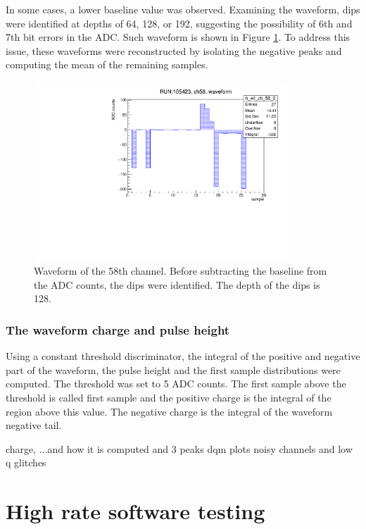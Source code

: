 In some cases, a lower baseline value was observed. Examining the waveform, dips were identified at depths of 64, 128, or 192, 
suggesting the possibility of 6th and 7th bit errors in the ADC. Such waveform is shown in Figure \ref{fig:dips}. 
To address this issue, these waveforms were reconstructed by isolating the negative peaks and computing the mean of the remaining samples.
\begin{figure}[!h]
  \centering
  \includegraphics[width=0.85\textwidth]{figures/pdf/wf_ch58_1.pdf}
  \caption{Waveform of the 58th channel. Before subtracting the baseline from the ADC counts, the dips were identified. The depth of the dips is 128.}
 \label{fig:dips}
\end{figure}
\subsubsection{The waveform charge and pulse height}
Using a constant threshold discriminator, the integral of the positive and negative part of the waveform, 
the pulse height and the first sample distributions were computed.
The threshold was set to 5 ADC counts. The first sample above the threshold is called first sample and the positive charge is the integral of the region above this value.
The negative charge is the integral of the waveform negative tail.

charge,  ...and how it is computed and 3 peaks
dqm plots
noisy channels and low q
glitches

\section{High rate software testing}
